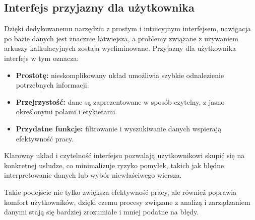 \subsection{Interfejs przyjazny dla użytkownika}
\begin{comment}Dedykowane narzędzie z prostym i intuicyjnym interfejsem znacząco ułatwia nawigację po bazie danych, eliminując problemy związane z tradycyjnymi rozwiązaniami, takimi jak arkusze kalkulacyjne. \end{comment} Dzięki dedykowanemu narzędziu z prostym i intuicyjnym interfejsem, nawigacja po bazie danych jest znacznie łatwiejsza, a problemy związane z używaniem arkuszy kalkulacyjnych zostają wyeliminowane. Przyjazny dla użytkownika interfejs w tym oznacza:
\begin{itemize}
    \item \textbf{Prostotę:} nieskomplikowany układ umożliwia szybkie odnalezienie potrzebnych informacji.
    \item \textbf{Przejrzystość:} dane są zaprezentowane w sposób czytelny, z jasno określonymi polami i etykietami.
    \item \textbf{Przydatne funkcje:} filtrowanie i wyszukiwanie danych wspierają efektywność pracy.
\end{itemize}
Klarowny układ i czytelność interfejsu pozwalają użytkownikowi skupić się na konkretnej usłudze, co minimalizuje ryzyko pomyłek, takich jak błędne interpretowanie danych lub wybór niewłaściwego wiersza.

Takie podejście nie tylko zwiększa efektywność pracy, ale również poprawia komfort użytkowników, dzięki czemu procesy związane z analizą i zarządzaniem danymi stają się bardziej zrozumiałe i mniej podatne na błędy.